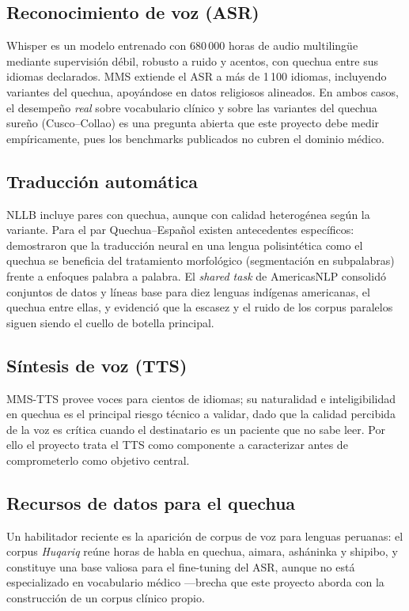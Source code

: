 \documentclass[12pt,a4paper]{article}
\begin{document}
\subsection{Reconocimiento de voz (ASR)}
Whisper \parencite{radford2023whisper} es un modelo entrenado con 680\,000 horas de audio
multiling{\"u}e mediante supervisi{\'o}n d{\'e}bil, robusto a ruido y acentos, con quechua entre
sus idiomas declarados. MMS \parencite{pratap2024mms} extiende el ASR a m{\'a}s de 1\,100
idiomas, incluyendo variantes del quechua, apoy{\'a}ndose en datos religiosos alineados. En
ambos casos, el desempe{\~n}o \emph{real} sobre vocabulario cl{\'i}nico y sobre las variantes
del quechua sure{\~n}o (Cusco--Collao) es una pregunta abierta que este proyecto debe medir
emp{\'i}ricamente, pues los benchmarks publicados no cubren el dominio m{\'e}dico.

\subsection{Traducci{\'o}n autom{\'a}tica}
NLLB \parencite{costajussa2022nllb} incluye pares con quechua, aunque con calidad
heterog{\'e}nea seg{\'u}n la variante. Para el par Quechua--Espa{\~n}ol existen antecedentes
espec{\'i}ficos: \textcite{ortega2020quechua} demostraron que la traducci{\'o}n neural en una
lengua polisint{\'e}tica como el quechua se beneficia del tratamiento morfol{\'o}gico
(segmentaci{\'o}n en subpalabras) frente a enfoques palabra a palabra. El \emph{shared task}
de AmericasNLP \parencite{mager2021americasnlp} consolid{\'o} conjuntos de datos y l{\'i}neas
base para diez lenguas ind{\'i}genas americanas, el quechua entre ellas, y evidenci{\'o} que la
escasez y el ruido de los corpus paralelos siguen siendo el cuello de botella principal.

\subsection{S{\'i}ntesis de voz (TTS)}
MMS-TTS \parencite{pratap2024mms} provee voces para cientos de idiomas; su naturalidad e
inteligibilidad en quechua es el principal riesgo t{\'e}cnico a validar, dado que la calidad
percibida de la voz es cr{\'i}tica cuando el destinatario es un paciente que no sabe leer. Por
ello el proyecto trata el TTS como componente a caracterizar antes de comprometerlo como
objetivo central.

\subsection{Recursos de datos para el quechua}
Un habilitador reciente es la aparici{\'o}n de corpus de voz para lenguas peruanas: el corpus
\emph{Huqariq} \parencite{zevallos2022huqariq} re{\'u}ne horas de habla en quechua, aimara,
ash{\'a}ninka y shipibo, y constituye una base valiosa para el fine-tuning del ASR, aunque no
est{\'a} especializado en vocabulario m{\'e}dico ---brecha que este proyecto aborda con la
construcci{\'o}n de un corpus cl{\'i}nico propio.
\end{document}
